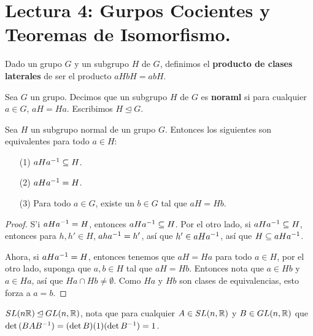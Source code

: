 \section*{Lectura 4: Gurpos Cocientes y Teoremas de Isomorfismo.}

\begin{definition}
    Dado un grupo $G$ y un subgrupo  $H$ de  $G$, definimos el  \textbf{producto
    de clases laterales} de ser el producto $aHbH=abH$.
\end{definition}

\begin{definition}
    Sea $G$ un grupo. Decimos que un subgrupo  $H$ de  $G$ es  \textbf{noraml}
    si para cualquier $a \in G$,  $aH=Ha$. Escribimos $H \unlhd G$.
\end{definition}

\begin{lemma}\label{lemma_4.8}
    Sea $H$ un subgrupo normal de un grupo  $G$. Entonces los siguientes son
    equivalentes para todo $a \in H$:
    \begin{enumerate}
        \item[(1)] $aHa^{-1} \subseteq H$.

        \item[(2)] $aHa^{-1}=H$.

        \item[(3)] Para todo $a \in G$, existe un  $b \in G$ tal que  $aH=Hb$.
    \end{enumerate}
\end{lemma}
\begin{proof}
    S'i $aHa^{-1}=H$, entonces $aHa^{-1} \subseteq H$. Por el otro lado, si
    $aHa^{-1} \subseteq H$, entonces para $h,h' \in H$,  $aha^{-1}=h'$, as\'i
    que $h' \in aHa^{-1}$, as\'i que $H \subseteq aHa^{-1}$.

    Ahora, si $aHa^{-1}=H$, entonces tenemos que $aH=Ha$ para todo  $a \in H$,
    por el otro lado, suponga que  $a,b \in H$ tal que  $aH=Hb$. Entonces nota
    que  $a \in Hb$ y  $a \in Ha$, as\'i que  $Ha \cap Hb \neq \emptyset$. Como
     $Ha$ y  $Hb$ son clases de equivalencias, esto forza a  $a=b$.
\end{proof}

\begin{example}\label{}
    $SL(n\mathbb{R}) \unlhd GL(n,\mathbb{R})$, nota que para cualquier $A \in SL(n,\mathbb{R})$ y $B \in
    GL(n,\mathbb{R})$ que $\det{(BAB^{-1})}=(\det{B})(1)(\det{B^{-1}})=1$.
\end{example}

